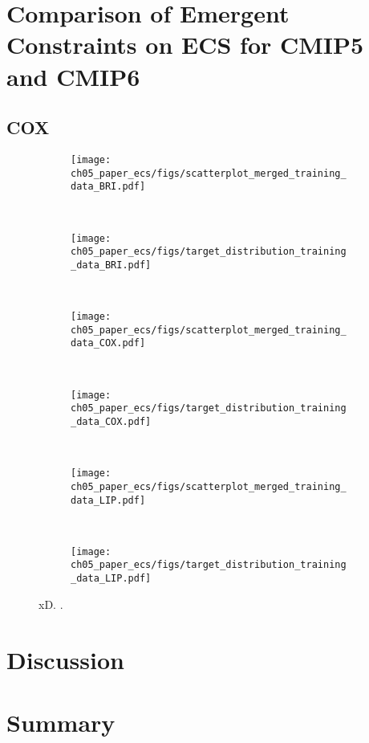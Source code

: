 \section{Comparison of Emergent Constraints on \acs{ECS} for \acs{CMIP}5 and
  \acs{CMIP}6}
\label{sec:05:comparison_of_emergent_constraints}


\subsection{COX}
\label{subsec:05:cox}

\begin{figure}[p]
  \centering
  \begin{subfigure}[b]{\SubfigureWidth{}}
    \texttt{[image: 
      ch05\_paper\_ecs/figs/scatterplot\_merged\_training\_data\_BRI.pdf]}
    \caption{}
    \label{fig:05:bri_cox_lip:a}
  \end{subfigure}
  ~
  \begin{subfigure}[b]{\SubfigureWidth{}}
    \texttt{[image: 
      ch05\_paper\_ecs/figs/target\_distribution\_training\_data\_BRI.pdf]}
    \caption{}
    \label{fig:05:bri_cox_lip:b}
  \end{subfigure}
  \\
  \begin{subfigure}[b]{\SubfigureWidth{}}
    \texttt{[image: 
      ch05\_paper\_ecs/figs/scatterplot\_merged\_training\_data\_COX.pdf]}
    \caption{}
    \label{fig:05:bri_cox_lip:c}
  \end{subfigure}
  ~
  \begin{subfigure}[b]{\SubfigureWidth{}}
    \texttt{[image: 
  ch05\_paper\_ecs/figs/target\_distribution\_training\_data\_COX.pdf]}
    \caption{}
    \label{fig:05:bri_cox_lip:d}
  \end{subfigure}
  \\
  \begin{subfigure}[b]{\SubfigureWidth{}}
    \texttt{[image: 
      ch05\_paper\_ecs/figs/scatterplot\_merged\_training\_data\_LIP.pdf]}
    \caption{}
    \label{fig:05:bri_cox_lip:e}
  \end{subfigure}
  ~
  \begin{subfigure}[b]{\SubfigureWidth{}}
    \texttt{[image: 
  ch05\_paper\_ecs/figs/target\_distribution\_training\_data\_LIP.pdf]}
    \caption{}
    \label{fig:05:bri_cox_lip:f}
  \end{subfigure}
  \caption{xD. .}
  \label{fig:05:bri_cox_lip}
\end{figure}


\section{Discussion}
\label{sec:05:discussion}


\section{Summary}
\label{sec:05:summary}
